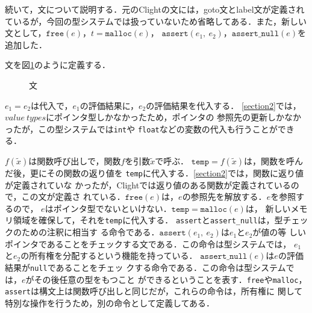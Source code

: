 続いて，文について説明する．元のClightの文には，goto文とlabel文が定義され
ているが，今回の型システムでは扱っていないため省略してある．また，新しい
文として，$\texttt{free}(e)$，$t = \texttt{malloc}(e)$，
$\texttt{assert}(e_{1},\ e_{2})$，$\texttt{assert\_null}(e)$を追加した．

\begin{definition}[文]
文を図\ref{clight_stmt}のように定義する．
\end{definition}
\begin{figure}[htbp]
  \centering
  \caption{文}
  \label{clight_stmt}
\end{figure}

$e_{1} = e_{2}$は代入で，$e_{1}$の評価結果に，$e_{2}$の評価結果を代入する．
\ref{section2}では，$value\ types$にポインタ型しかなかったため，ポインタの
参照先の更新しかなかったが，この型システムでは\texttt{int}や
\texttt{float}などの変数の代入も行うことができる．

$f(\tilde{x})$は関数呼び出しで，関数$f$を引数$\tilde{x}$で呼ぶ．
$\texttt{temp} = f(\tilde{x})$は，関数を呼んだ後，更にその関数の返り値を
\texttt{temp}に代入する．\ref{section2}では，関数に返り値が定義されていな
かったが，Clightでは返り値のある関数が定義されているので，この文が定義さ
れている．$\texttt{free}(e)$は，$e$の参照先を解放する．$e$を参照するので，
$e$はポインタ型でないといけない．$\texttt{temp} = \texttt{malloc}(e)$は，
新しいメモリ領域を確保して，それを\texttt{temp}に代入する．
\texttt{assert}と\texttt{assert\_null}は，型チェックのための注釈に相当す
る命令である．$\texttt{assert}(e_{1},\ e_{2})$は$e_{1}$と$e_{2}$が値の等
しいポインタであることをチェックする文である．この命令は型システムでは，
$e_{1}$と$e_{2}$の所有権を分配するという機能を持っている．
$\texttt{assert\_null}(e)$は$e$の評価結果が\texttt{null}であることをチェッ
クする命令である．この命令は型システムでは，$e$がその後任意の型をもつこと
ができるということを表す．\texttt{free}や\texttt{malloc}，
\texttt{assert}は構文上は関数呼び出しと同じだが，これらの命令は，所有権に
関して特別な操作を行うため，別の命令として定義してある．

